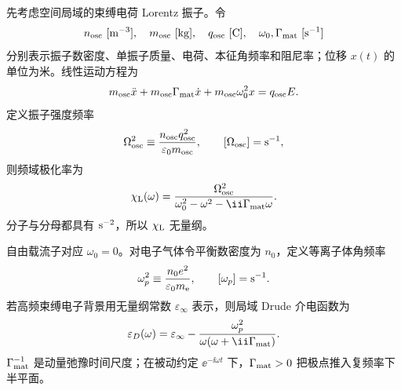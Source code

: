 \begin{exbox}
先考虑空间局域的束缚电荷 Lorentz 振子。令
\begin{equation*}
n_{\rm osc}\ [{\rm m^{-3}}],
\quad
m_{\rm osc}\ [{\rm kg}],
\quad
q_{\rm osc}\ [{\rm C}],
\quad
\omega_0,\Gamma_{\rm mat}\ [{\rm s^{-1}}]
\end{equation*}
分别表示振子数密度、单振子质量、电荷、本征角频率和阻尼率；位移 $x(t)$ 的单位为米。线性运动方程为
\begin{equation*}
m_{\rm osc}\ddot x
+m_{\rm osc}\Gamma_{\rm mat}\dot x
+m_{\rm osc}\omega_0^2x
=q_{\rm osc}E.
\end{equation*}
定义振子强度频率
\begin{equation*}
\Omega_{\rm osc}^2
\equiv
\frac{n_{\rm osc}q_{\rm osc}^2}
{\varepsilon_0m_{\rm osc}},
\qquad
[\Omega_{\rm osc}]={\rm s^{-1}},
\end{equation*}
则频域极化率为
\begin{equation*}
\chi_{\rm L}(\omega)
=\frac{\Omega_{\rm osc}^2}
{\omega_0^2-\omega^2-\ii\Gamma_{\rm mat}\omega}.
\end{equation*}
分子与分母都具有 ${\rm s^{-2}}$，所以 $\chi_{\rm L}$ 无量纲。

自由载流子对应 $\omega_0=0$。对电子气体令平衡数密度为 $n_0$，定义等离子体角频率
\begin{equation*}
\omega_p^2
\equiv\frac{n_0e^2}{\varepsilon_0m_{\mathrm e}},
\qquad
[\omega_p]={\rm s^{-1}}.
\end{equation*}
若高频束缚电子背景用无量纲常数 $\varepsilon_\infty$ 表示，则局域 Drude 介电函数为
\begin{equation*}
\varepsilon_D(\omega)
=\varepsilon_\infty
-\frac{\omega_p^2}
{\omega(\omega+\ii\Gamma_{\rm mat})}.
\end{equation*}
$\Gamma_{\rm mat}^{-1}$ 是动量弛豫时间尺度；在被动约定 $\ee^{-\ii\omega t}$ 下，$\Gamma_{\rm mat}>0$ 把极点推入复频率下半平面。


\end{exbox}
